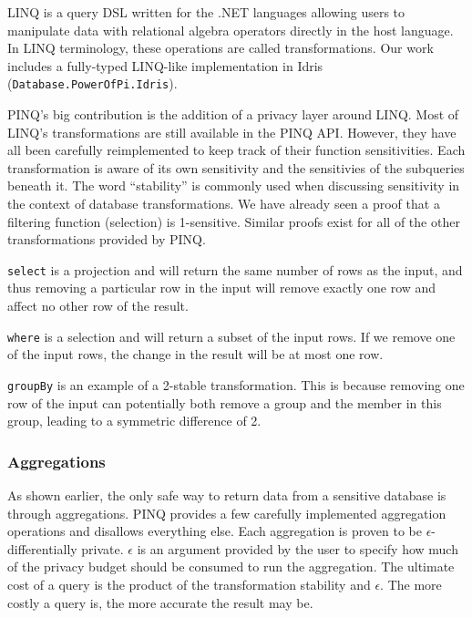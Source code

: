 \documentclass[12pt]{article}
\begin{document}
LINQ is a query DSL written for the .NET languages allowing users to manipulate data with relational algebra operators directly in the host language.
In LINQ terminology, these operations are called transformations.
Our work includes a fully-typed LINQ-like implementation in Idris (\texttt{Database.PowerOfPi.Idris}).

PINQ's big contribution is the addition of a privacy layer around LINQ.
Most of LINQ's transformations are still available in the PINQ API.
However, they have all been carefully reimplemented to keep track of their function sensitivities.
Each transformation is aware of its own sensitivity and the sensitivies of the subqueries beneath it.
The word ``stability'' is commonly used when discussing sensitivity in the context of database transformations.
We have already seen a proof that a filtering function (selection) is 1-sensitive.
Similar proofs exist for all of the other transformations provided by PINQ.


\texttt{select} is a projection and will return the same number of rows as the input, and thus removing a particular row in the input will remove exactly one row and affect no other row of the result.

\texttt{where} is a selection and will return a subset of the input rows.
If we remove one of the input rows, the change in the result will be at most one row.

\texttt{groupBy} is an example of a 2-stable transformation.
This is because removing one row of the input can potentially both remove a group and the member in this group, leading to a symmetric difference of 2.

\subsubsection{Aggregations}

As shown earlier, the only safe way to return data from a sensitive database is through aggregations.
PINQ provides a few carefully implemented aggregation operations and disallows everything else.
Each aggregation is proven to be $\epsilon$-differentially private.
$\epsilon$ is an argument provided by the user to specify how much of the privacy budget should be consumed to run the aggregation.
The ultimate cost of a query is the product of the transformation stability and $\epsilon$.
The more costly a query is, the more accurate the result may be.
\end{document}
